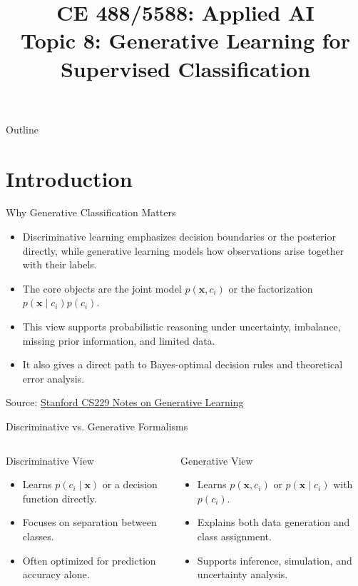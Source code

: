 \documentclass[10pt]{beamer}
\title[Topic 8]{CE 488/5588: Applied AI\\\large Topic 8: Generative Learning for Supervised Classification}
\author{}
\date{}
\begin{document}
\begin{frame}[plain]
  \titlepage
\end{frame}

\begin{frame}{Outline}
  \justifying
  \tableofcontents
\end{frame}

\section{Introduction}

\begin{frame}{Why Generative Classification Matters}
  \justifying
  \begin{itemize}
    \item Discriminative learning emphasizes decision boundaries or the posterior directly, while generative learning models how observations arise together with their labels.
    \item The core objects are the joint model $p(\bm{x},c_i)$ or the factorization $p(\bm{x}\mid c_i)p(c_i)$.
    \item This view supports probabilistic reasoning under uncertainty, imbalance, missing prior information, and limited data.
    \item It also gives a direct path to Bayes-optimal decision rules and theoretical error analysis.
  \end{itemize}
  \vspace{0.3em}
  {\footnotesize Source: \href{https://cs229.stanford.edu/notes2020fall/cs229-notes2.pdf}{Stanford CS229 Notes on Generative Learning}}
\end{frame}

\begin{frame}{Discriminative vs. Generative Formalisms}
  \justifying
  \begin{columns}[T]
    \begin{conceptbox}{Discriminative View}
      \begin{itemize}
        \item Learns $p(c_i\mid\bm{x})$ or a decision function directly.
        \item Focuses on separation between classes.
        \item Often optimized for prediction accuracy alone.
      \end{itemize}
    \end{conceptbox}
    \begin{examplebox}{Generative View}
      \begin{itemize}
        \item Learns $p(\bm{x},c_i)$ or $p(\bm{x}\mid c_i)$ with $p(c_i)$.
        \item Explains both data generation and class assignment.
        \item Supports inference, simulation, and uncertainty analysis.
      \end{itemize}
    \end{examplebox}
  \end{columns}
\end{frame}
\end{document}
